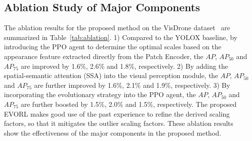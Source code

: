 \documentclass[letterpaper]{article} %
\newcommand\blue[1]{\textcolor{blue}{#1}}
\begin{document}
\subsection{Ablation Study of Major Components}
\label{ssec: ablation-study}
The ablation results for the proposed method on the VisDrone dataset~\cite{Zhu_2022_VisDrone} are summarized in Table~\ref{tab:ablation}.
1) Compared to the YOLOX baseline, by introducing the PPO agent to determine the optimal scales based on the appearance feature extracted directly from the Patch Encoder, the $AP$, $AP_{50}$ and $AP_{75}$ are improved by 1.6\%, 2.6\% and 1.8\%, respectively. 
2) By adding the spatial-semantic attention (SSA) into the visual perception module, the $AP$, $AP_{50}$ and $AP_{75}$ are further improved by 1.6\%, 2.1\% and 1.9\%, respectively. 
3) By incorporating the evolutionary strategy into the PPO agent, the $AP$, $AP_{50}$ and $AP_{75}$ are further boosted by 1.5\%, 2.0\% and 1.5\%, respectively. 
The proposed EVORL makes good use of the past experience to refine the derived scaling factors, so that it mitigates the outlier scaling factors. These ablation results show the effectiveness of the major components in the proposed method. 
\end{document}
